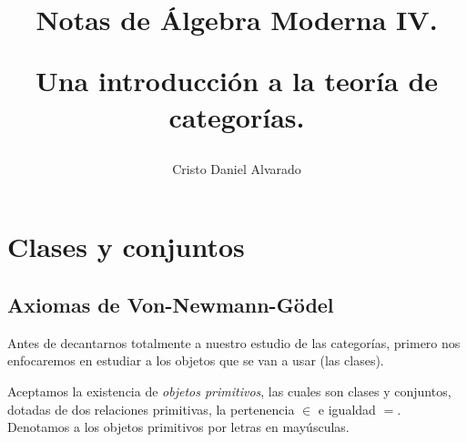 \documentclass[12pt]{report}
\theoremstyle{largebreak}
\begin{document}
    \setlength{\parskip}{5pt} %
    \setlength{\parindent}{12pt} %
    \title{Notas de Álgebra Moderna IV.
    
    Una introducción a la teoría de categorías.}
    \author{Cristo Daniel Alvarado}
    \maketitle

    \tableofcontents %


    \chapter{Clases y conjuntos}

    \section{Axiomas de Von-Newmann-Gödel}

    Antes de decantarnos totalmente a nuestro estudio de las categorías, primero nos enfocaremos en estudiar a los objetos que se van a usar (las clases).

    Aceptamos la existencia de \textit{objetos primitivos}, las cuales son clases y conjuntos, dotadas de dos relaciones primitivas, la pertenencia $\in$ e igualdad $=$. Denotamos a los objetos primitivos por letras en mayúsculas.
\end{document}
